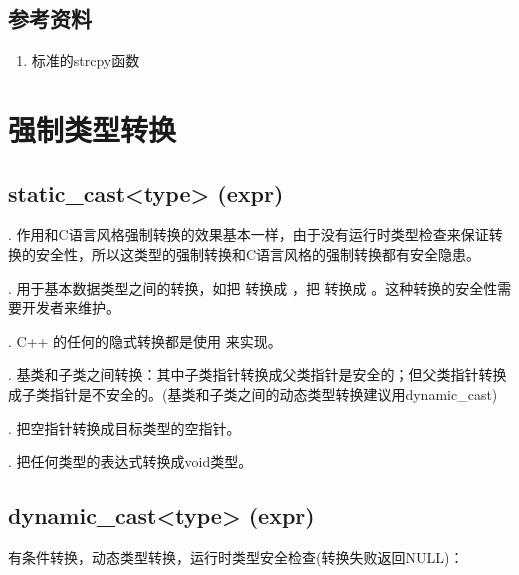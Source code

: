 \documentclass[letterpaper,10pt,english]{sphinxmanual}
\begin{document}
\subsection{参考资料}
\label{\detokenize{cpp/09_strcpy:id2}}\begin{enumerate}
\item {} 
标准的strcpy函数

\end{enumerate}
\begin{quote}

\end{quote}


\section{强制类型转换}
\label{\detokenize{cpp/10_cast::doc}}\label{\detokenize{cpp/10_cast:id1}}

\subsection{static\_cast\textless{}type\textgreater{} (expr)}
\label{\detokenize{cpp/10_cast:static-cast-type-expr}}
.  作用和C语言风格强制转换的效果基本一样，由于没有运行时类型检查来保证转换的安全性，所以这类型的强制转换和C语言风格的强制转换都有安全隐患。

. 用于基本数据类型之间的转换，如把  转换成  ，把  转换成  。这种转换的安全性需要开发者来维护。

. C++ 的任何的隐式转换都是使用  来实现。

. 基类和子类之间转换：其中子类指针转换成父类指针是安全的；但父类指针转换成子类指针是不安全的。(基类和子类之间的动态类型转换建议用dynamic\_cast)

. 把空指针转换成目标类型的空指针。

. 把任何类型的表达式转换成void类型。


\subsection{dynamic\_cast\textless{}type\textgreater{} (expr)}
\label{\detokenize{cpp/10_cast:dynamic-cast-type-expr}}
有条件转换，动态类型转换，运行时类型安全检查(转换失败返回NULL)：
\end{document}
